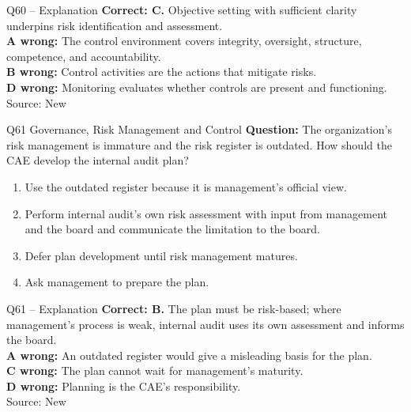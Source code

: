 \documentclass[aspectratio=169,10pt]{beamer}
\begin{document}
\begin{frame}[t]{Q60 -- Explanation}
	\footnotesize
	\textbf{Correct: C.} Objective setting with sufficient clarity underpins risk identification and assessment. \\[5pt]
\textbf{A wrong:} The control environment covers integrity, oversight, structure, competence, and accountability. \\[3pt]
\textbf{B wrong:} Control activities are the actions that mitigate risks. \\[3pt]
\textbf{D wrong:} Monitoring evaluates whether controls are present and functioning. \\[3pt]
	\vfill {\tiny Source: New}
\end{frame}

\begin{frame}[t]{Q61 \hfill {\scriptsize Governance, Risk Management and Control}}
	\small
	\textbf{Question:} The organization's risk management is immature and the risk register is outdated. How should the CAE develop the internal audit plan?
	\begin{enumerate}[label=\Alph*.,itemsep=1pt,topsep=3pt]
			\item Use the outdated register because it is management's official view.
			\item Perform internal audit's own risk assessment with input from management and the board and communicate the limitation to the board.
			\item Defer plan development until risk management matures.
			\item Ask management to prepare the plan.
	\end{enumerate}
\end{frame}

\begin{frame}[t]{Q61 -- Explanation}
	\footnotesize
	\textbf{Correct: B.} The plan must be risk-based; where management's process is weak, internal audit uses its own assessment and informs the board. \\[5pt]
\textbf{A wrong:} An outdated register would give a misleading basis for the plan. \\[3pt]
\textbf{C wrong:} The plan cannot wait for management's maturity. \\[3pt]
\textbf{D wrong:} Planning is the CAE's responsibility. \\[3pt]
	\vfill {\tiny Source: New}
\end{frame}
\end{document}
